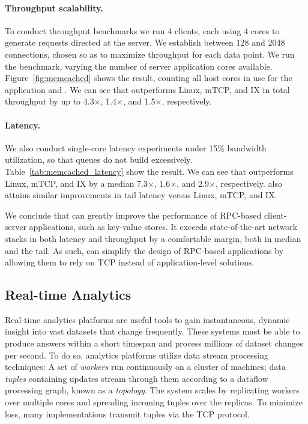 \paragraph{Throughput scalability.} To conduct throughput benchmarks
we run 4 clients, each using 4 cores to generate requests directed at the
server.
We establish between 128 and 2048 connections, chosen so as to maximize
throughput for each data point.
We run the
benchmark, varying the number of server application cores
available. Figure~\ref{fig:memcached} shows the result, counting all
host cores in use for the application and \rmttcp. We can see that
\rmttcp outperforms Linux, mTCP, and IX in total throughput by up to
4.3$\times$, 1.4$\times$, and 1.5$\times$, respectively.

\paragraph{Latency.} We also conduct single-core latency experiments
under 15\% bandwidth utilization, so that queues do not build
excessively. Table~\ref{tab:memcached_latency} show the result.
We can see that \rmttcp outperforms Linux, mTCP, and IX
by a median 7.3$\times$, 1.6$\times$, and 2.9$\times$, respectively.
\rmttcp also attains similar improvements in tail latency versus Linux, mTCP,
and IX.

\vspace{1ex}
\noindent We conclude that \rmttcp can greatly improve the performance
of RPC-based client-server applications, such as key-value stores. It
exceeds state-of-the-art network stacks in both latency and throughput
by a comfortable margin, both in median and the tail. As such, \rmttcp
can simplify the design of RPC-based applications by allowing them 
to rely on TCP instead of application-level solutions.

\subsection{Real-time Analytics}

Real-time analytics platforms are useful tools to gain instantaneous,
dynamic insight into vast datasets that change frequently. These
systems must be able to produce answers within a short timespan and
process millions of dataset changes per second. To do so, analytics
platforms utilize data stream processing techniques: A set of
\emph{workers} run continuously on a cluster of machines; data
\emph{tuples} containing updates stream through them according to a
dataflow processing graph, known as a \emph{topology}.
%
The system scales by replicating workers over multiple cores and spreading incoming tuples
over the replicas. %
To minimize loss, many implementations transmit tuples via the TCP protocol.

